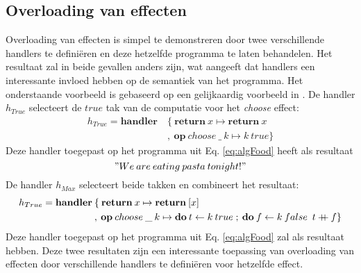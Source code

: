 \subsection{Overloading van effecten}
Overloading van effecten is simpel te demonstreren door twee verschillende handlers te definiëren en deze hetzelfde programma te laten behandelen. Het resultaat zal in beide gevallen anders zijn, wat aangeeft dat handlers een interessante invloed hebben op de semantiek van het programma. Het onderstaande voorbeeld is gebaseerd op een gelijkaardig voorbeeld in \cite{Bosman2022}. \newline 
De handler $h_{True}$ selecteert de $true$ tak van de computatie voor het \textit{choose} effect:
\begin{equation}
    \begin{split}
        h_{True} = \textbf{handler} \: & \{ \: \textbf{return}\:x \mapsto \textbf{return}\:x \\
         & , \: \textbf{op}\:choose\:\_\:k \mapsto k \: true\}
    \end{split}
\end{equation}
Deze handler toegepast op het programma uit Eq. \ref{eq:algFood} heeft als resultaat
\begin{equation}
    "We\:are\:eating\:pasta\:tonight!"
\end{equation} 
De handler $h_{Max}$ selecteert beide takken en combineert het resultaat:
\begin{equation}
    \begin{split}
        h_{True} = \textbf{handler} \: & \{ \: \textbf{return}\:x \mapsto \textbf{return}\:[x] \\
        & , \: \textbf{op}\:choose\:\_\:k \mapsto \textbf{do}\:t \leftarrow k \: true\;;\: \textbf{do}\:f \leftarrow k\:false\;\:t \mathbin{{+}\mspace{-8mu}{+}} f \}
    \end{split}
\end{equation}
Deze handler toegepast op het programma uit Eq. \ref{eq:algFood} zal als resultaat
\begin{equation}
    ["We\:are\:eating\:pasta\:tonight!",\:"We\:are\:eating\:pizza\:tonight!"]
\end{equation} 
hebben. Deze twee resultaten zijn een interessante toepassing van overloading van effecten door verschillende handlers te definiëren voor hetzelfde effect.


